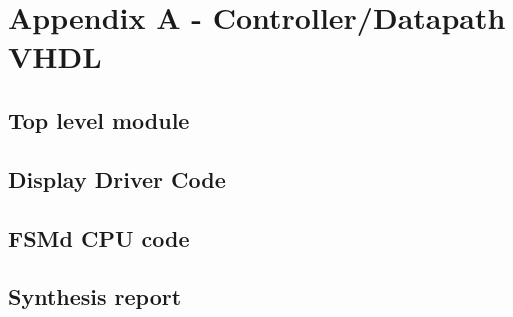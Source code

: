 \section{Appendix A - Controller/Datapath VHDL}
\subsection{Top level module}

\subsection{Display Driver Code}









\subsection{FSMd CPU code}


\subsection{Synthesis report}

